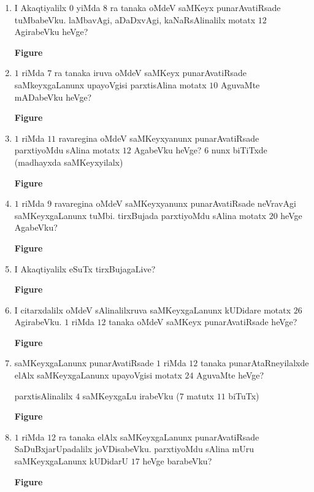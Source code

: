 \begin{enumerate}
\item I Akaqtiyalilx $0$ yiMda $8$ ra tanaka oMdeV saMKeyx punarAvatiRsade tuMbabeVku. laMbavAgi, aDaDxvAgi, kaNaRsAlinalilx motatx $12$ AgirabeVku heVge?
\begin{center}
{\rm\bfseries Figure}
\end{center}

\item $1$ riMda $7$ ra tanaka iruva oMdeV saMKeyx punarAvatiRsade saMkeyxgaLanunx upayoVgisi parxtisAlina motatx $10$ AguvaMte mADabeVku heVge?
\begin{center}
{\rm\bfseries Figure}
\end{center}

\item $1$ riMda $11$ ravaregina oMdeV saMKeyxyanunx punarAvatiRsade parxtiyoMdu sAlina motatx $12$ AgabeVku heVge? $6$ nunx biTiTxde (madhayxda saMKeyxyilalx)
\begin{center}
{\rm\bfseries Figure}
\end{center}

\item $1$ riMda $9$ ravaregina oMdeV saMKeyxyanunx punarAvatiRsade neVravAgi saMKeyxgaLanunx tuMbi. tirxBujada parxtiyoMdu sAlina motatx $20$ heVge AgabeVku?
\begin{center}
{\rm\bfseries Figure}
\end{center}

\item I Akaqtiyalilx eSuTx tirxBujagaLive?
\begin{center}
{\rm\bfseries Figure}
\end{center}

\item I citarxdalilx oMdeV sAlinalilxruva saMKeyxgaLanunx kUDidare motatx $26$ AgirabeVku. $1$ riMda $12$ tanaka oMdeV saMKeyx punarAvatiRsade heVge?
\begin{center}
{\rm\bfseries Figure}
\end{center}

\item saMKeyxgaLanunx punarAvatiRsade $1$ riMda $12$ tanaka punarAtaRneyilalxde elAlx saMKeyxgaLanunx upayoVgisi motatx $24$ AguvaMte heVge?

parxtisAlinalilx $4$ saMKeyxgaLu irabeVku ($7$ matutx $11$ biTuTx)
\begin{center}
{\rm\bfseries Figure}
\end{center}

\item $1$ riMda $12$ ra tanaka elAlx saMKeyxgaLanunx punarAvatiRsade SaDuBxjarUpadalilx joVDisabeVku. parxtiyoMdu sAlina mUru saMKeyxgaLanunx kUDidarU $17$ heVge barabeVku?
\begin{center}
{\rm\bfseries Figure}
\end{center}


\end{enumerate}
